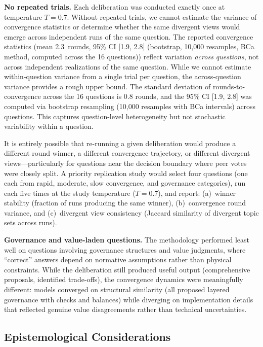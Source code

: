\documentclass[11pt,a4paper]{article}
\begin{document}
\textbf{No repeated trials.} Each deliberation was conducted exactly once at temperature $T = 0.7$. Without repeated trials, we cannot estimate the variance of convergence statistics or determine whether the same divergent views would emerge across independent runs of the same question. The reported convergence statistics (mean 2.3~rounds, 95\% CI [1.9, 2.8] (bootstrap, 10,000 resamples, BCa method, computed across the 16 questions)) reflect variation \emph{across questions}, not across independent realizations of the same question. While we cannot estimate within-question variance from a single trial per question, the across-question variance provides a rough upper bound. The standard deviation of rounds-to-convergence across the 16 questions is 0.8 rounds, and the 95\% CI [1.9, 2.8] was computed via bootstrap resampling (10,000 resamples with BCa intervals) across questions. This captures question-level heterogeneity but not stochastic variability within a question.

It is entirely possible that re-running a given deliberation would produce a different round winner, a different convergence trajectory, or different divergent views---particularly for questions near the decision boundary where peer votes were closely split. A priority replication study would select four questions (one each from rapid, moderate, slow convergence, and governance categories), run each five times at the study temperature ($T = 0.7$), and report: (a)~winner stability (fraction of runs producing the same winner), (b)~convergence round variance, and (c)~divergent view consistency (Jaccard similarity of divergent topic sets across runs).

\textbf{Governance and value-laden questions.} The methodology performed least well on questions involving governance structures and value judgments, where ``correct'' answers depend on normative assumptions rather than physical constraints. While the deliberation still produced useful output (comprehensive proposals, identified trade-offs), the convergence dynamics were meaningfully different: models converged on structural similarity (all proposed layered governance with checks and balances) while diverging on implementation details that reflected genuine value disagreements rather than technical uncertainties.

\subsection{Epistemological Considerations}
\end{document}
